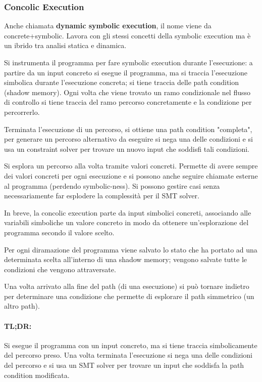 \subsubsection{Concolic Execution}

Anche chiamata \textbf{dynamic symbolic execution}, il nome viene da concrete+symbolic. Lavora con gli stessi concetti della symbolic execution ma è un ibrido tra analisi statica e dinamica.

Si instrumenta il programma per fare symbolic execution durante l'esecuzione: a partire da un input concreto si esegue il programma, ma si traccia l'esecuzione simbolica durante l'esecuzione concreta; si tiene traccia delle path condition (shadow memory). Ogni volta che viene trovato un ramo condizionale nel flusso di controllo si tiene traccia del ramo percorso concretamente e la condizione per percorrerlo.

Terminata l'esecuzione di un percorso, si ottiene una path condition "completa", per generare un percorso alternativo da eseguire si nega una delle condizioni e si usa un constraint solver per trovare un nuovo input che soddisfi tali condizioni.

Si esplora un percorso alla volta tramite valori concreti. Permette di avere sempre dei valori concreti per ogni esecuzione e si possono anche seguire chiamate esterne al programma (perdendo symbolic-ness). Si possono gestire casi senza necessariamente far esplodere la complessità per il SMT solver.



In breve, la concolic execution parte da input simbolici concreti, associando alle variabili simboliche un valore concreto in modo da ottenere un'esplorazione del programma secondo il valore scelto. 

Per ogni diramazione del programma viene salvato lo stato che ha portato ad una determinata scelta all'interno di una shadow memory; vengono salvate tutte le condizioni che vengono attraversate. 

Una volta arrivato alla fine del path (di una esecuzione) si può tornare indietro per determinare una condizione che permette di esplorare il path simmetrico (un altro path).

\paragraph{TL;DR:} Si esegue il programma con un input concreto, ma si tiene traccia simbolicamente del percorso preso. Una volta terminata l'esecuzione si nega una delle condizioni del percorso e si usa un SMT solver per trovare un input che soddisfa la path condition modificata.

